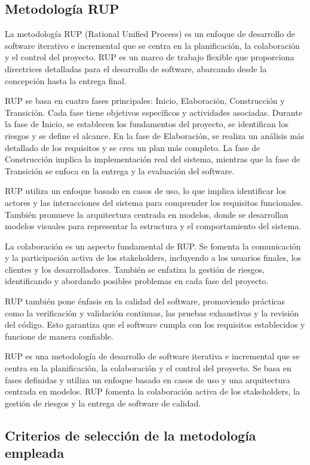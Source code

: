 \documentclass[12pt,a4paper]{article}
\newcommand{\espacio}{\par\vspace{3mm}}
\newcommand{\newsubsection}[1]{\subsection{\hspace{4mm} #1}}
\begin{document}
\subsection*{Metodología RUP}
\espacio La metodología RUP (Rational Unified Process) es un enfoque de desarrollo de software iterativo e incremental que se centra en la planificación, la colaboración y el control del proyecto. RUP es un marco de trabajo flexible que proporciona directrices detalladas para el desarrollo de software, abarcando desde la concepción hasta la entrega final.
\espacio RUP se basa en cuatro fases principales: Inicio, Elaboración, Construcción y Transición. Cada fase tiene objetivos específicos y actividades asociadas. Durante la fase de Inicio, se establecen los fundamentos del proyecto, se identifican los riesgos y se define el alcance. En la fase de Elaboración, se realiza un análisis más detallado de los requisitos y se crea un plan más completo. La fase de Construcción implica la implementación real del sistema, mientras que la fase de Transición se enfoca en la entrega y la evaluación del software.
\espacio RUP utiliza un enfoque basado en casos de uso, lo que implica identificar los actores y las interacciones del sistema para comprender los requisitos funcionales. También promueve la arquitectura centrada en modelos, donde se desarrollan modelos visuales para representar la estructura y el comportamiento del sistema.
\espacio La colaboración es un aspecto fundamental de RUP. Se fomenta la comunicación y la participación activa de los stakeholders, incluyendo a los usuarios finales, los clientes y los desarrolladores. También se enfatiza la gestión de riesgos, identificando y abordando posibles problemas en cada fase del proyecto.
\espacio RUP también pone énfasis en la calidad del software, promoviendo prácticas como la verificación y validación continuas, las pruebas exhaustivas y la revisión del código. Esto garantiza que el software cumpla con los requisitos establecidos y funcione de manera confiable.
\espacio RUP es una metodología de desarrollo de software iterativa e incremental que se centra en la planificación, la colaboración y el control del proyecto. Se basa en fases definidas y utiliza un enfoque basado en casos de uso y una arquitectura centrada en modelos. RUP fomenta la colaboración activa de los stakeholders, la gestión de riesgos y la entrega de software de calidad.

\newsubsection{Criterios de selección de la metodología empleada}
\end{document}
